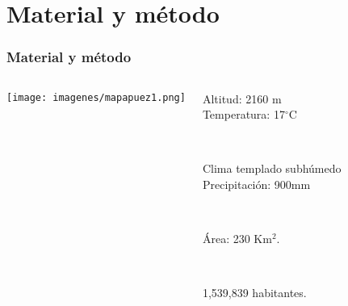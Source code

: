 \documentclass[compress]{beamer}
\begin{document}
\section{Material y método}
{
\begin{frame}
\frametitle{Material y método}
\begin{columns}[c]

\vspace{-1cm}
\begin{center}
\hspace*{-0.5cm}\texttt{[image: imagenes/mapapuez1.png]}\\

\end{center}
\pause
{}
\vspace{-2.3cm}
\begin{itemize}
\small{  \item   Altitud: 2160 m\\
Temperatura: 17$^{\circ}$C\\}\\[1cm]
\pause
\small{ \item Clima templado subhúmedo\\
Precipitación: 900mm}\\[1cm]
\pause
\small{ \item Área: 230 Km$^{2}$.}\\[1cm]
\pause
\small{ \item  1,539,839 habitantes.}
\end{itemize}
\end{columns}
\end{frame}
}



\end{document}

